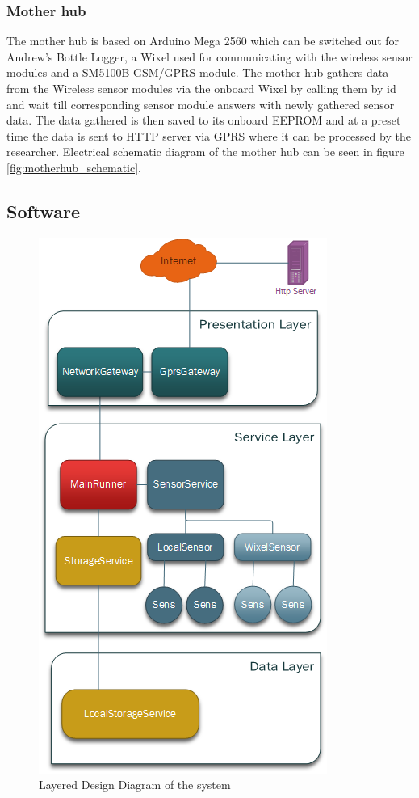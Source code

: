 \subsubsection{Mother hub}
The mother hub is based on Arduino Mega 2560\cite{arduinoMega} which can be switched out 
for Andrew's Bottle Logger\cite{ALog-BottleLogger}, a Wixel\cite{wixel} used for 
communicating with the wireless sensor modules and a SM5100B GSM/GPRS 
module\cite{SM5100B}. The mother hub gathers data from the Wireless sensor modules via 
the onboard Wixel by calling them by id and wait till corresponding sensor module answers
with newly gathered sensor data. The data gathered is then saved to its onboard EEPROM
and at a preset time the data is sent to HTTP server via GPRS where it can be processed 
by the researcher. Electrical schematic diagram of the mother hub can be seen in figure 
\ref{fig:motherhub_schematic}.

\subsection{Software}
\begin{figure}
\centering
\includegraphics[width=0.6\linewidth]{graphics/Layering}
\caption{Layered Design Diagram of the system\label{fig:Layering}}
\end{figure}

